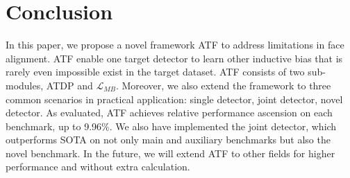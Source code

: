 \documentclass[journal,transmag]{IEEEtran}
\makeatletter
\newcommand{\tabincell}[2]{\begin{tabular}{@{}#1@{}}#2\end{tabular}}
\makeatother
\begin{document}




\section{Conclusion}
\label{sec:conclusion}

In this paper, we propose a novel framework ATF to address limitations in face alignment.
ATF enable one target detector to learn other inductive bias that is rarely even impossible exist in the target dataset.
ATF consists of two sub-modules, ATDP and $\mathcal{L}_{MB}$.
Moreover, we also extend the framework to three common scenarios in practical application: single detector, joint detector, novel detector.
As evaluated, ATF achieves relative performance ascension on each benchmark, up to 9.96\%.
We also have implemented the joint detector, which outperforms SOTA on not only main and auxiliary benchmarks but also the novel benchmark.
In the future, we will extend ATF to other fields for higher performance and without extra calculation.
\end{document}
